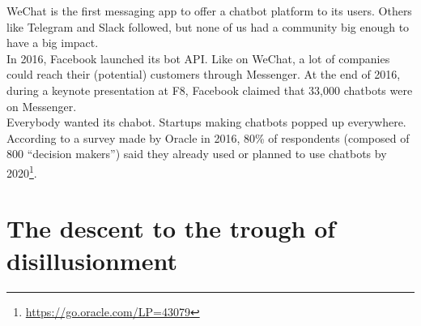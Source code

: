 \documentclass{article}
\begin{document}
\break
WeChat is the first messaging app to offer a chatbot platform to its users. Others like Telegram and Slack followed, but none of us had a community big enough to have a big impact.\\
In 2016, Facebook launched its bot API. Like on WeChat, a lot of companies could reach their (potential) customers through Messenger. At the end of 2016, during a keynote presentation at F8, Facebook claimed that 33,000 chatbots were on Messenger.\\
Everybody wanted its chabot. Startups making chatbots popped up everywhere. According to a survey made by Oracle in 2016, 80\% of respondents (composed of 800 “decision makers”) said they already used or planned to use chatbots by 2020\footnote{\url{https://go.oracle.com/LP=43079}}. 

\section{The descent to the trough of disillusionment}
\end{document}
